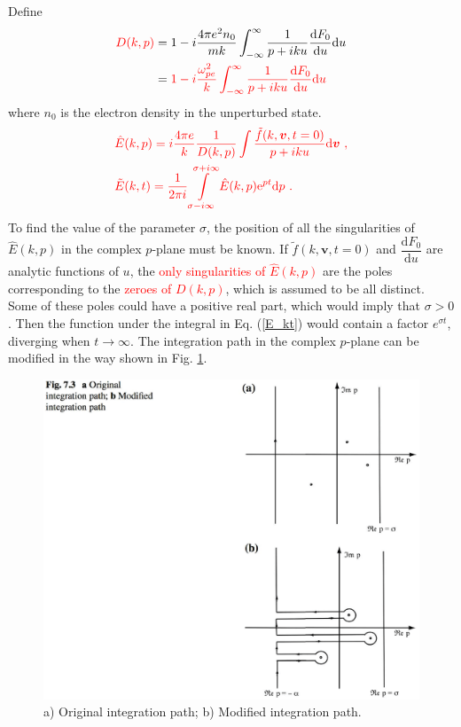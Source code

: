 \documentclass[12pt,a4paper]{article}
\renewcommand{\vec}[1]{\boldsymbol{#1}}
\newcommand{\dif}{\mathrm{d}}
\begin{document}
Define 
\begin{align}
\nonumber \color{red} D(k, p) &= 1 -i \frac{4\pi e^2 n_0}{mk} \int_{-\infty}^\infty  \frac{1}{p+iku} \frac{\dif F_0}{\dif u}  \dif u \\
&= \color{red} 1 -i \frac{\omega^2_{pe} }{k} \int_{-\infty}^\infty  \frac{1}{p+iku} \frac{\dif F_0}{\dif u}  \dif u
\label{D_kp}
\end{align}
where $n_0$ is the electron density in the unperturbed state. 
\begin{align}
& \color{red} \hat{E}(k, p) = i \frac{4\pi e}{k} \frac{1}{D(k, p)} \int \frac{\tilde{f}(k, \vec{v}, t=0)}{p+iku} \dif \vec{v} ~, \\
& \color{red} \tilde{E}(k, t) = \frac{1}{2\pi i} \int\limits_{\sigma-i\infty}^{\sigma+i\infty} \hat{E}(k, p) {\rm e}^{pt} \dif p ~.
\label{E_kt}
\end{align}
To find the value of the parameter $\sigma$, the position of all the singularities of $\widehat{E}(k, p)$ in the complex $p$-plane must be known. If $\tilde{f}(k, \vec{v}, t = 0)$ and $\dfrac{\dif F_0}{\dif u}$ are analytic functions of $u$, the \textcolor{red}{only singularities of $\hat{E}(k, p)$} are the poles corresponding to the \textcolor{red}{zeroes of $D(k, p)$}, which is assumed to be all distinct. Some of these poles could have a positive real part, which would imply that $\sigma > 0$. Then the function under the integral in Eq. (\ref{E_kt}) would contain a factor $e^{\sigma t}$, diverging when $t \rightarrow \infty$. The integration path in the complex $p$-plane can be modified in the way shown in Fig. \ref{fig:inlaplace}. 
\begin{figure}
\centering
\includegraphics[height=10.cm, angle=0]{inlaplace.eps}
\caption{
a) Original integration path; b) Modified integration path.
}
\label{fig:inlaplace}
\end{figure}
\end{document}
